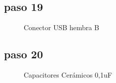 \documentclass[letterpaper,10pt,english]{sphinxmanual}
\begin{document}
\subsection{paso 19}
\label{np07:paso-19}\begin{figure}[htbp]
\centering
\capstart

\noindent{}
\caption{Conector USB hembra B}\label{np07:id25}\end{figure}
\newpage

\subsection{paso 20}
\label{np07:paso-20}\begin{figure}[htbp]
\centering
\capstart

\noindent{}
\caption{Capacitores Cerámicos 0,1uF}\label{np07:id26}\end{figure}
\newpage


\renewcommand{\indexname}{Index}
\printindex
\end{document}
